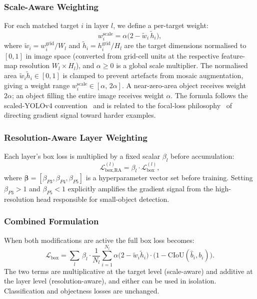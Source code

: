 \documentclass[conference]{IEEEtran}
\begin{document}
\subsubsection{Scale-Aware Weighting}
For each matched target $i$ in layer $l$, we define a per-target weight:
%
\begin{equation}
  w_i^{\text{scale}} = \alpha\bigl(2 - \tilde{w}_i\,\tilde{h}_i\bigr),
  \label{eq:scale_weight}
\end{equation}
%
where $\tilde{w}_i = w_i^{\text{grid}}/W_l$ and
$\tilde{h}_i = h_i^{\text{grid}}/H_l$ are the target dimensions normalised
to $[0,1]$ in image space (converted from grid-cell units at the respective
feature-map resolution $W_l \times H_l$), and $\alpha \geq 0$ is a global
scale multiplier.  The normalised area
$\tilde{w}_i\tilde{h}_i \in [0,1]$ is clamped to prevent artefacts from
mosaic augmentation, giving a weight range
$w_i^{\text{scale}} \in [\alpha,\,2\alpha]$.
A near-zero-area object receives weight $2\alpha$; an object filling the
entire image receives weight $\alpha$.  The formula follows the scaled-YOLOv4
convention~\cite{wang2021scaledyolov4} and is related to the focal-loss
philosophy~\cite{lin2017focal} of directing gradient signal toward harder
examples.

\subsubsection{Resolution-Aware Layer Weighting}
Each layer's box loss is multiplied by a fixed scalar $\beta_l$ before
accumulation:
%
\begin{equation}
  \mathcal{L}_{\text{box,RA}}^{(l)} = \beta_l \cdot \mathcal{L}_{\text{box}}^{(l)},
  \label{eq:res_weight}
\end{equation}
%
where $\boldsymbol{\beta} = [\beta_{P3},\beta_{P4},\beta_{P5}]$ is a
hyperparameter vector set before training.  Setting $\beta_{P3} > 1$ and
$\beta_{P5} < 1$ explicitly amplifies the gradient signal from the
high-resolution head responsible for small-object detection.

\subsubsection{Combined Formulation}
When both modifications are active the full box loss becomes:
%
\begin{equation}
  \boxed{
  \mathcal{L}_{\text{box}} = \sum_{l}\, \beta_l \cdot
    \frac{1}{N_l}\sum_{i=1}^{N_l}
      \alpha\bigl(2 - \tilde{w}_i\tilde{h}_i\bigr)
      \cdot\bigl(1 - \text{CIoU}(\hat{b}_i, b_i)\bigr).
  }
  \label{eq:combined}
\end{equation}
%
The two terms are multiplicative at the target level (scale-aware) and
additive at the layer level (resolution-aware), and either can be used in
isolation.  Classification and objectness losses are unchanged.
\end{document}
